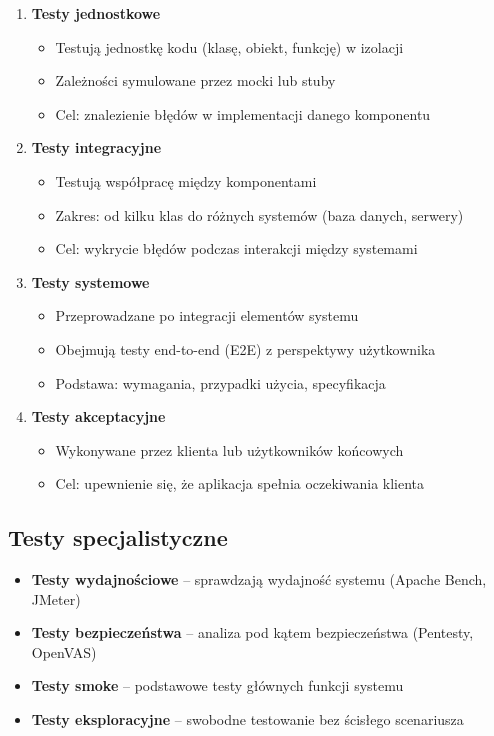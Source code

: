 \begin{enumerate}
\item \textbf{Testy jednostkowe}
    \begin{itemize}
        \item Testują jednostkę kodu (klasę, obiekt, funkcję) w izolacji
        \item Zależności symulowane przez mocki lub stuby
        \item Cel: znalezienie błędów w implementacji danego komponentu
    \end{itemize}

\item \textbf{Testy integracyjne}
    \begin{itemize}
        \item Testują współpracę między komponentami
        \item Zakres: od kilku klas do różnych systemów (baza danych, serwery)
        \item Cel: wykrycie błędów podczas interakcji między systemami
    \end{itemize}

\item \textbf{Testy systemowe}
    \begin{itemize}
        \item Przeprowadzane po integracji elementów systemu
        \item Obejmują testy end-to-end (E2E) z perspektywy użytkownika
        \item Podstawa: wymagania, przypadki użycia, specyfikacja
    \end{itemize}

\item \textbf{Testy akceptacyjne}
    \begin{itemize}
        \item Wykonywane przez klienta lub użytkowników końcowych
        \item Cel: upewnienie się, że aplikacja spełnia oczekiwania klienta
    \end{itemize}
\end{enumerate}

\subsection{Testy specjalistyczne}

\begin{itemize}
    \item \textbf{Testy wydajnościowe} -- sprawdzają wydajność systemu (Apache Bench, JMeter)
    \item \textbf{Testy bezpieczeństwa} -- analiza pod kątem bezpieczeństwa (Pentesty, OpenVAS)
    \item \textbf{Testy smoke} -- podstawowe testy głównych funkcji systemu
    \item \textbf{Testy eksploracyjne} -- swobodne testowanie bez ścisłego scenariusza
\end{itemize}

